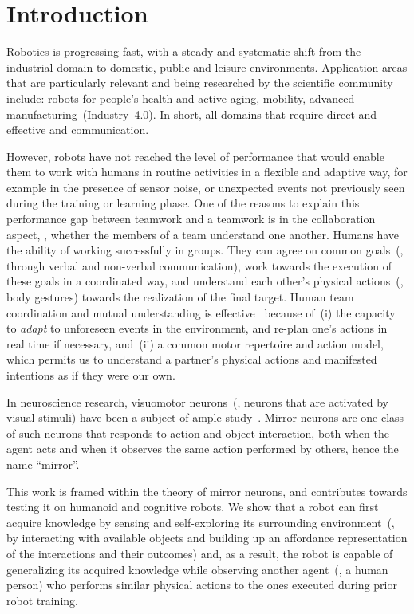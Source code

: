 
\section{Introduction}


Robotics is progressing fast, with a steady and systematic shift from the industrial domain to domestic, public and leisure environments. Application areas that are particularly relevant and being researched by the scientific community include: robots for people's health and active aging, mobility, advanced manufacturing~(Industry~4.0). In short, all domains that require direct and effective \hri and communication.

However, robots have not reached the level of performance that would enable them to work with humans in routine activities in a flexible and adaptive way, for example in the presence of sensor noise, or unexpected events not previously seen during the training or learning phase. One of the reasons to explain this performance gap between \hh{} teamwork and a \hr{} teamwork is in the collaboration aspect, \ie, whether the members of a team understand one another. Humans have the ability of working successfully in groups. They can agree on common goals~(\eg, through verbal and non-verbal communication), work towards the execution of these goals in a coordinated way, and understand each other's physical actions~(\eg, body gestures) towards the realization of the final target. Human team coordination and mutual understanding is effective~\cite{ramnani:2004:natureneuro} because of~(i) the capacity to \emph{adapt} to unforeseen events in the environment, and re-plan one's actions in real time if necessary, and~(ii) a common motor repertoire and action model, which permits us to understand a partner's physical actions and manifested intentions as if they were our own.

In neuroscience research, visuomotor neurons~(\ie, neurons that are activated by visual stimuli) have been a subject of ample study~\cite{rizzolatti:2001:nrn}. Mirror neurons are one class of such neurons that responds to action and object interaction, both when the agent acts and when it observes the same action performed by others, hence the name ``mirror''.

This work is framed within the theory of mirror neurons, and contributes towards testing it on humanoid and cognitive robots. We show that a robot can first acquire knowledge by sensing and self-exploring its surrounding environment~(\eg, by interacting with available objects and building up an affordance representation of the interactions and their outcomes) and, as a result, the robot is capable of generalizing its acquired knowledge while observing another agent~(\eg, a human person) who performs similar physical actions to the ones executed during prior robot training.
